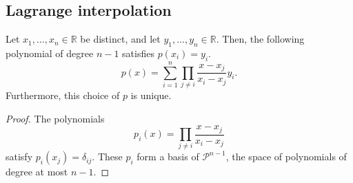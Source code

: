 \documentclass[11pt]{article}
\newcommand{\R}{\mathbb{R}}
\theoremstyle{definition}
\theoremstyle{remark}
\numberwithin{equation}{section}
\begin{document}
    \subsection{Lagrange interpolation}
    \begin{theorem}
        Let $x_1, \dots, x_n \in \R$ be distinct, and let $y_1, \dots, y_n \in \R$.
        Then, the following polynomial of degree $n - 1$ satisfies $p(x_i) = y_i$. \[
            p(x) = \sum_{i = 1}^{n} \prod_{j \neq i} \frac{x - x_j}{x_i - x_j} y_i.
        \] Furthermore, this choice of $p$ is unique.
    \end{theorem}
    \begin{proof}
        The polynomials \[
            p_i(x) = \prod_{j \neq i} \frac{x - x_j}{x_i - x_j}
        \] satisfy $p_i(x_j) = \delta_{ij}$. These $p_i$ form a basis of
        $\mathscr{P}^{n - 1}$, the space of polynomials of degree at most $n - 1$.
    \end{proof}
    
\end{document}
